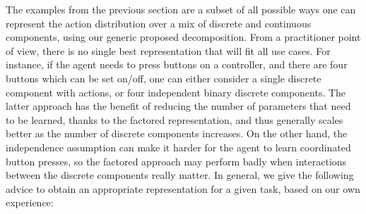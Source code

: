 \documentclass[letterpaper]{article} \usepackage{aaai20}  \usepackage{times}  \usepackage{helvet} \usepackage{courier}  \usepackage[hyphens]{url}  \usepackage{graphicx} \urlstyle{rm} \def\UrlFont{\rm}  \usepackage{graphicx}  \usepackage[section]{placeins}
\begin{document}
The examples from the previous section are a subset of all possible ways one can represent the action distribution over a mix of discrete and continuous components, using our generic proposed decomposition.
From a practitioner point of view, there is no single best representation that will fit all use cases.
For instance, if the agent needs to press buttons on a controller, and there are four buttons which can be set on/off, one can either consider a single discrete component with  actions, or four independent binary discrete components.
The latter approach has the benefit of reducing the number of parameters that need to be learned, thanks to the factored representation, and thus generally scales better as the number of discrete components increases.
On the other hand, the independence assumption can make it harder for the agent to learn coordinated button presses, so the factored approach may perform badly when interactions between the discrete components really matter.
In general, we give the following advice to obtain an appropriate representation for a given task, based on our own experience:
\end{document}
